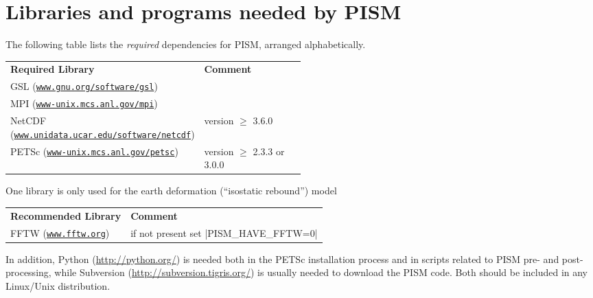 \documentclass[11pt,final]{amsart}
\newcommand{\PETSCREL}{2.3.3 or 3.0.0}
\newcommand{\normalspacing}{\renewcommand{\baselinestretch}{1.1}\tiny\normalsize}
\renewcommand{\t}[1]{\texttt{#1}}
\begin{document}
\clearpage
\section{Libraries and programs needed by PISM}
\label{sec:prerequisites}

\bigskip
The following table lists the \emph{required} dependencies for PISM, arranged alphabetically.
\bigskip
\newcommand{\fattablespacing}{\renewcommand{\baselinestretch}{1.5}\tiny\normalsize}
\fattablespacing
\newcommand\pairstack[2]{#1 \quad (\small#2\normalsize)}
\begin{center}
\begin{tabular*}{1.0\linewidth}{lp{0.5\linewidth}}\hline
  \textbf{Required Library} & \textbf{Comment} \\
  \pairstack{GSL}{\href{http://www.gnu.org/software/gsl/}{\t{www.gnu.org/software/gsl}}}  &  \\
  \pairstack{MPI}{\href{http://www-unix.mcs.anl.gov/mpi/}{\t{www-unix.mcs.anl.gov/mpi}}}  & \\
  \pairstack{NetCDF}{\href{http://www.unidata.ucar.edu/software/netcdf/}{\t{www.unidata.ucar.edu/software/netcdf}}}  & version $\ge$ 3.6.0\\
  \pairstack{PETSc}{\href{http://www-unix.mcs.anl.gov/petsc/petsc-as/}{\t{www-unix.mcs.anl.gov/petsc}}}  & version $\ge$ \PETSCREL \\
  \hline
\end{tabular*}
\end{center}
\normalspacing\bigskip

\noindent One library is only used for the earth deformation (``isostatic rebound'') model
\bigskip
\fattablespacing
\begin{center}
\begin{tabular*}{1.0\linewidth}{ll}\hline
  \textbf{Recommended Library} & \textbf{Comment} \\
  \pairstack{FFTW}{\href{http://www.fftw.org/}{\t{www.fftw.org}}}\hspace{1.9in} & if not present set |PISM_HAVE_FFTW=0|\\
  \hline
\end{tabular*}
\end{center}
\normalspacing
\bigskip

\noindent In addition, Python (\url{http://python.org/}) is needed both in the PETSc installation process and in scripts related to PISM pre- and post-processing, while Subversion (\url{http://subversion.tigris.org/}) is usually needed to download the PISM code.  Both should be included in any Linux/Unix distribution.
\end{document}
